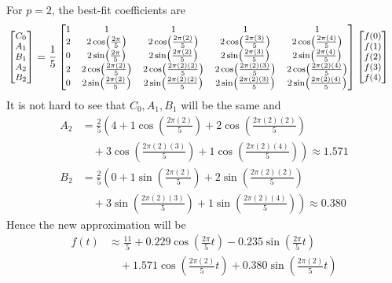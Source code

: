 \begin{solution}
For $p = 2$, the best-fit coefficients are
\begin{align*}
\footnotesize
\begin{bmatrix}
C_0 \\
A_1 \\
B_1 \\
A_2 \\
B_2
\end{bmatrix}
&= 
\frac{1}{5}
\footnotesize
\begin{bmatrix}
1 & 1 & 1 & 1 & 1 \\
2 & 2\cos(\frac{2\pi}{5}) & 2\cos(\frac{2\pi(2)}{5}) & 2\cos(\frac{2\pi(3)}{5}) & 2\cos(\frac{2\pi(4)}{5}) \\
0 & 2\sin(\frac{2\pi}{5}) & 2\sin(\frac{2\pi(2)}{5}) & 2\sin(\frac{2\pi(3)}{5}) & 2\sin(\frac{2\pi(4)}{5}) \\
2 & 2\cos(\frac{2\pi(2)}{5}) & 2\cos(\frac{2\pi(2)(2)}{5}) & 2\cos(\frac{2\pi(2)(3)}{5}) & 2\cos(\frac{2\pi(2)(4)}{5}) \\
0 & 2\sin(\frac{2\pi(2)}{5}) & 2\sin(\frac{2\pi(2)(2)}{5}) & 2\sin(\frac{2\pi(2)(3)}{5}) & 2\sin(\frac{2\pi(2)(4)}{5})
\end{bmatrix}
\footnotesize
\begin{bmatrix}
f(0)\\
f(1)\\
f(2)\\
f(3)\\
f(4)
\end{bmatrix}     
\end{align*}
It is not hard to see that $C_0, A_1, B_1$ will be the same and
\begin{align*}
A_2 &= \frac{2}{5} \left(4 + 1\cos(\frac{2\pi(2)}{5}) + 2\cos(\frac{2\pi(2)(2)}{5}) \right. \\
&\quad \left.{} + 3\cos(\frac{2\pi(2)(3)}{5}) + 1\cos(\frac{2\pi(2)(4)}{5})\right) \approx 1.571 \\
B_2 &= \frac{2}{5} \left(0 + 1\sin(\frac{2\pi(2)}{5}) + 2\sin(\frac{2\pi(2)(2)}{5}) \right. \\
&\quad \left.{} + 3\sin(\frac{2\pi(2)(3)}{5}) + 1\sin(\frac{2\pi(2)(4)}{5})\right) \approx 0.380
\end{align*}
Hence the new approximation will be 
\begin{align*}
f(t) &\approx \frac{11}{5} + 0.229 \cos(\frac{2\pi}{5}t) - 0.235 \sin(\frac{2\pi}{5}t) \\
&\quad + 1.571 \cos(\frac{2\pi(2)}{5}t) + 0.380 \sin(\frac{2\pi(2)}{5}t)    

\end{align*}
\end{solution}
